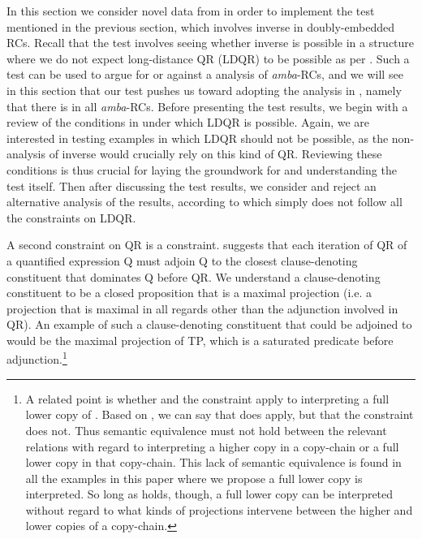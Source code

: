 \documentclass[output=paper
,newtxmath
,modfonts
,nonflat]{langsci/langscibook}
\begin{document}
In this section we consider novel data from  in order to implement the test mentioned in the previous section, which involves inverse  in doubly-embedded RCs. Recall that the test involves seeing whether inverse  is possible in a structure where we do not expect long-distance QR (LDQR) to be possible as per \citet{Fox2000}. Such a test can be used to argue for or against a  analysis of \textit{amba}{}-RCs, and we will see in this section that our test pushes us toward adopting the analysis in , namely that there is  in all \textit{amba}{}-RCs. Before presenting the test results, we begin with a review of the conditions in \citet{Fox2000} under which LDQR is possible. Again, we are interested in testing examples in which LDQR should not be possible, as the non- analysis of inverse  would crucially rely on this kind of QR. Reviewing these conditions is thus crucial for laying the groundwork for and understanding the test itself. Then after discussing the test results, we consider and reject an alternative analysis of the results, according to which  simply does not follow all the constraints on LDQR.


A second constraint on QR is a  constraint. \citet[23, 63]{Fox2000} suggests that each iteration of QR of a quantified expression Q must adjoin Q to the closest clause-denoting constituent that dominates Q before QR. We understand a clause-denoting constituent to be a closed proposition that is a maximal projection (i.e. a projection that is maximal in all regards other than the adjunction involved in QR). An example of such a clause-denoting constituent that could be adjoined to would be the maximal projection of TP, which is a saturated predicate before adjunction.\footnote{A related point is whether  and the  constraint apply to interpreting a full lower copy of . Based on \citet[p. 23; n. 6, p. 23]{Fox2000}, we can say that  does apply, but that the  constraint does not. Thus semantic equivalence must not hold between the relevant  relations with regard to interpreting a higher copy in a copy-chain or a full lower copy in that copy-chain. This lack of semantic equivalence is found in all the examples in this paper where we propose a full lower copy is interpreted. So long as  holds, though, a full lower copy can be interpreted without regard to what kinds of projections intervene between the higher and lower copies of a copy-chain.\label{fnlabel}}
\end{document}
